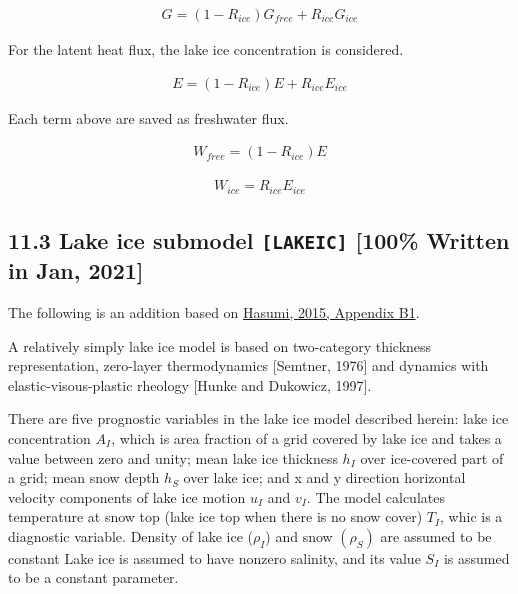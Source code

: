 \begin{eqnarray}
    G=(1-R_{ice})G_{free} + R_{ice}G_{ice}
\end{eqnarray}

For the latent heat flux, the lake ice concentration is considered.

\begin{eqnarray}
    E=(1-R_{ice})E + R_{ice}E_{ice}
\end{eqnarray}

Each term above are saved as freshwater flux.

\begin{eqnarray}
    W_{free} = (1-R_{ice}) E
\end{eqnarray}

\begin{eqnarray}
    W_{ice} = R_{ice} E_{ice}
\end{eqnarray}

\hypertarget{lake-ice-submodel-lakeic-100-written-in-jan-2021}{%
\subsection{\texorpdfstring{11.3 Lake ice submodel \texttt{{[}LAKEIC{]}}
{[}100\% Written in Jan,
2021{]}}{11.3 Lake ice submodel {[}LAKEIC{]} {[}100\% Written in Jan, 2021{]}}}\label{lake-ice-submodel-lakeic-100-written-in-jan-2021}}

The following is an addition based on
\href{https://ccsr.aori.u-tokyo.ac.jp/~hasumi/COCO/coco4.pdf}{Hasumi,
2015, Appendix B1}.

A relatively simply lake ice model is based on two-category thickness
representation, zero-layer thermodynamics {[}Semtner, 1976{]} and
dynamics with elastic-visous-plastic rheology {[}Hunke and Dukowicz,
1997{]}.

There are five prognostic variables in the lake ice model described
herein: lake ice concentration \(A_I\), which is area fraction of a grid
covered by lake ice and takes a value between zero and unity; mean lake
ice thickness \(h_I\) over ice-covered part of a grid; mean snow depth
\(h_S\) over lake ice; and x and y direction horizontal velocity
components of lake ice motion \(u_I\) and \(v_I\). The model calculates
temperature at snow top (lake ice top when there is no snow cover)
\(T_I\), whic is a diagnostic variable. Density of lake ice (\(\rho_I\))
and snow \((\rho_S)\) are assumed to be constant Lake ice is assumed to
have nonzero salinity, and its value \(S_I\) is assumed to be a constant
parameter.

